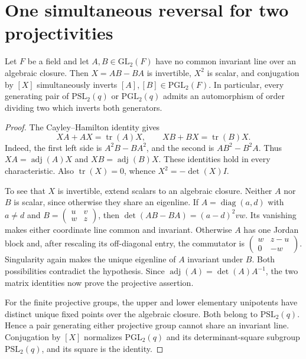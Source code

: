 \section{One simultaneous reversal for two projectivities}
\begin{theorem}\label{E.SimultaneousReversal}
Let $F$ be a field and let $A,B\in\mathrm{GL}_2(F)$ have no common
invariant line over an algebraic closure. Then $X=AB-BA$ is invertible,
$X^2$ is scalar, and conjugation by $[X]$ simultaneously inverts
$[A],[B]\in\mathrm{PGL}_2(F)$. In particular, every generating pair of
$\mathrm{PSL}_2(q)$ or $\mathrm{PGL}_2(q)$ admits an automorphism of
order dividing two which inverts both generators.
\end{theorem}
\begin{proof}
The Cayley--Hamilton identity gives
\[
 XA+AX=\operatorname{tr}(A)X,\qquad
 XB+BX=\operatorname{tr}(B)X.
\]
Indeed, the first left side is $A^2B-BA^2$, and the second is
$AB^2-B^2A$. Thus $XA=\operatorname{adj}(A)X$ and
$XB=\operatorname{adj}(B)X$. These identities hold in every
characteristic. Also $\operatorname{tr}(X)=0$, whence
$X^2=-\det(X)I$.

To see that $X$ is invertible, extend scalars to an algebraic closure.
Neither $A$ nor $B$ is scalar, since otherwise they share an eigenline.
If $A=\operatorname{diag}(a,d)$ with $a\ne d$ and
$B=\left(\begin{smallmatrix}u&v\\w&z\end{smallmatrix}\right)$,
then $\det(AB-BA)=(a-d)^2vw$. Its vanishing makes either coordinate
line common and invariant. Otherwise $A$ has one Jordan block and,
after rescaling its off-diagonal entry, the commutator is
$\left(\begin{smallmatrix}w&z-u\\0&-w\end{smallmatrix}\right)$.
Singularity again makes the unique eigenline of $A$ invariant under
$B$. Both possibilities contradict the hypothesis. Since
$\operatorname{adj}(A)=\det(A)A^{-1}$, the two matrix identities now
prove the projective assertion.

For the finite projective groups, the upper and lower elementary
unipotents have distinct unique fixed points over the algebraic closure.
Both belong to $\mathrm{PSL}_2(q)$. Hence a pair generating either
projective group cannot share an invariant line. Conjugation by $[X]$
normalizes $\mathrm{PGL}_2(q)$ and its determinant-square subgroup
$\mathrm{PSL}_2(q)$, and its square is the identity.
\end{proof}

